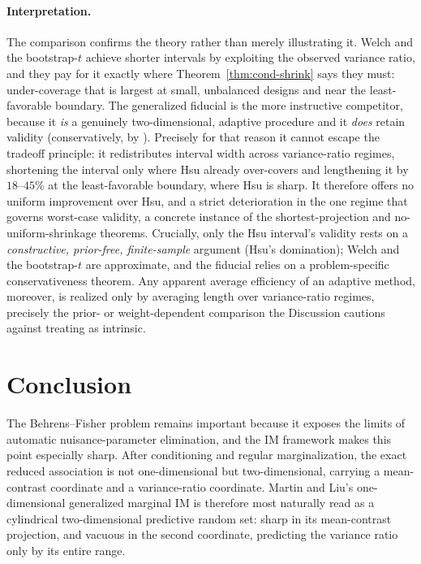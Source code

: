 \documentclass[12pt]{article}
\begin{document}
\paragraph{Interpretation.}
The comparison confirms the theory rather than merely illustrating it.  Welch and
the bootstrap-\(t\) achieve shorter intervals by exploiting the observed variance
ratio, and they pay for it exactly where Theorem~\ref{thm:cond-shrink} says they
must: under-coverage that is largest at small, unbalanced designs and near the
least-favorable boundary.  The generalized fiducial is the more instructive
competitor, because it \emph{is} a genuinely two-dimensional, adaptive procedure
and it \emph{does} retain validity (conservatively, by \citet{Robinson1976}).
Precisely for that reason it cannot escape the tradeoff principle: it redistributes
interval width across variance-ratio regimes, shortening the interval only where
Hsu already over-covers and lengthening it by \(18\)--\(45\%\) at the
least-favorable boundary, where Hsu is sharp.  It therefore offers no uniform
improvement over Hsu, and a strict deterioration in the one regime that governs
worst-case validity, a concrete instance of the shortest-projection and
no-uniform-shrinkage theorems.  Crucially, only the Hsu interval's validity rests
on a \emph{constructive, prior-free, finite-sample} argument (Hsu's domination);
Welch and the bootstrap-\(t\) are approximate, and the fiducial relies on a
problem-specific conservativeness theorem.  Any apparent average efficiency of an
adaptive method, moreover, is realized only by averaging length over
variance-ratio regimes, precisely the prior- or weight-dependent comparison the
Discussion cautions against treating as intrinsic.

\section{Conclusion}
\label{sec:conclusion}

The Behrens--Fisher problem remains important because it exposes the limits of
automatic nuisance-parameter elimination, and the IM framework makes this point
especially sharp.  After conditioning and regular marginalization, the exact
reduced association is not one-dimensional but two-dimensional, carrying a
mean-contrast coordinate and a variance-ratio coordinate.  Martin and Liu's
one-dimensional generalized marginal IM is therefore most naturally read as a
cylindrical two-dimensional predictive random set: sharp in its mean-contrast
projection, and vacuous in the second coordinate, predicting the variance ratio
only by its entire range.
\end{document}
